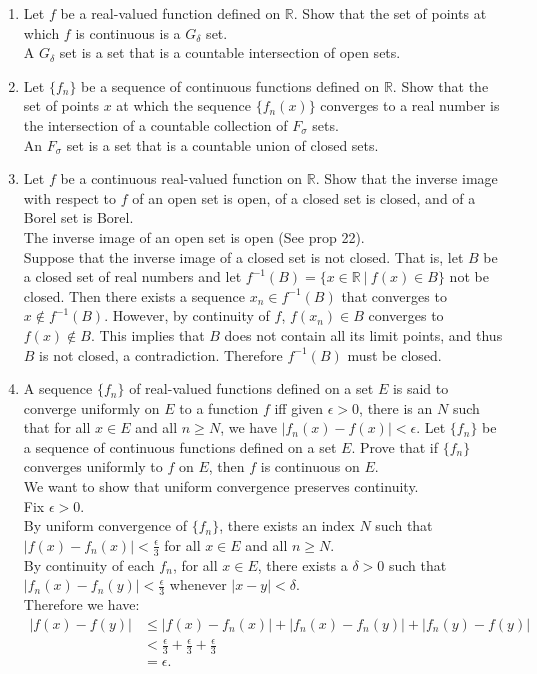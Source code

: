 \begin{enumerate}
	\item Let $f$ be a real-valued function defined on $\mathbb{R}$. Show that the set of points at which $f$ is continuous is a $G_\delta$ set.\\
	A $G_\delta$ set is a set that is a countable intersection of open sets.
	\item Let $\{ f_n\}$ be a sequence of continuous functions defined on $\mathbb{R}$. Show that the set of points $x$ at which the sequence $\{f_n(x)\}$ converges to a real number is the intersection of a countable collection of $F_\sigma$ sets.\\
	An $F_\sigma$ set is a set that is a countable union of closed sets.
	\item Let $f$ be a continuous real-valued function on $\mathbb{R}$. Show that the inverse image with respect to $f$ of an open set is open, of a closed set is closed, and of a Borel set is Borel.\\
	The inverse image of an open set is open (See prop 22).\\
	Suppose that the inverse image of a closed set is not closed.
	That is, let $B$ be a closed set of real numbers and let $f^{-1}(B)=\{x\in\mathbb{R}\ |\ f(x)\in B\}$ not be closed. 
	Then there exists a sequence $x_n\in f^{-1}(B)$ that converges to $x \notin f^{-1}(B)$.
	However, by continuity of $f$, $f(x_n)\in B$ converges to $f(x)\notin B$.
	This implies that $B$ does not contain all its limit points, and thus $B$ is not closed, a contradiction.
	Therefore $f^{-1}(B)$ must be closed.
	\item A sequence $\{f_n\}$ of real-valued functions defined on a set $E$ is said to converge uniformly on $E$ to a function $f$ iff given $\epsilon >0$, there is an $N$ such that for all $x \in E$ and all $n \ge N$, we have $|f_n(x) - f(x)| < \epsilon$. Let $\{f_n\}$ be a sequence of continuous functions defined on a set $E$. Prove that if $\{f_n\}$ converges uniformly to $f$ on $E$, then $f$ is continuous on $E$.\\
	We want to show that uniform convergence preserves continuity.\\
	Fix $\epsilon>0$.\\
	By uniform convergence of $\{f_n\}$, there exists an index $N$ such that $|f(x)-f_n(x)|<\frac{\epsilon}{3}$ for all $x\in E$ and all $n\ge N$.\\
	By continuity of each $f_n$, for all $x\in E$, there exists a $\delta>0$ such that $|f_n(x)-f_n(y)|<\frac{\epsilon}{3}$ whenever $|x-y|<\delta$.\\
	Therefore we have:
	\begin{align*}
		|f(x)-f(y)|&\le|f(x)-f_n(x)|+|f_n(x)-f_n(y)|+|f_n(y)-f(y)|\\
		&<\frac{\epsilon}{3}+\frac{\epsilon}{3}+\frac{\epsilon}{3}\\
		&=\epsilon.
	\end{align*}
\end{enumerate}
